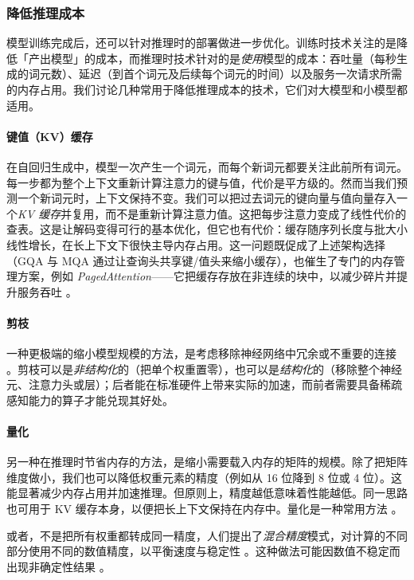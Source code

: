 \subsubsection{降低推理成本}
模型训练完成后，还可以针对推理时的部署做进一步优化。训练时技术关注的是降低「产出模型」的成本，而推理时技术针对的是\emph{使用}模型的成本：吞吐量（每秒生成的词元数）、延迟（到首个词元及后续每个词元的时间）以及服务一次请求所需的内存占用。我们讨论几种常用于降低推理成本的技术，它们对大模型和小模型都适用。

\paragraph{键值（KV）缓存} 在自回归生成中，模型一次产生一个词元，而每个新词元都要关注此前所有词元。每一步都为整个上下文重新计算注意力的键与值，代价是平方级的。然而当我们预测一个新词元时，上下文保持不变。我们可以把过去词元的键向量与值向量存入一个\emph{KV 缓存}并复用，而不是重新计算注意力值。这把每步注意力变成了线性代价的查表。这是让解码变得可行的基本优化，但它也有代价：缓存随序列长度与批大小线性增长，在长上下文下很快主导内存占用。这一问题既促成了上述架构选择（GQA 与 MQA 通过让查询头共享键/值头来缩小缓存），也催生了专门的内存管理方案，例如 \emph{PagedAttention}——它把缓存存放在非连续的块中，以减少碎片并提升服务吞吐 \citep{kwon2023efficient}。

\paragraph{剪枝} 一种更极端的缩小模型规模的方法，是考虑移除神经网络中冗余或不重要的连接 \citep{ma2023llm}。剪枝可以是\emph{非结构化}的（把单个权重置零），也可以是\emph{结构化}的（移除整个神经元、注意力头或层）；后者能在标准硬件上带来实际的加速，而前者需要具备稀疏感知能力的算子才能兑现其好处。

\paragraph{量化} 另一种在推理时节省内存的方法，是缩小需要载入内存的矩阵的规模。除了把矩阵维度做小，我们也可以降低权重元素的精度（例如从 16 位降到 8 位或 4 位）。这能显著减少内存占用并加速推理。但原则上，精度越低意味着性能越低。同一思路也可用于 KV 缓存本身，以便把长上下文保持在内存中。量化是一种常用方法 \citep{dettmers2022gpt3, dettmers2023case, xiao2023smoothquant}。

或者，不是把所有权重都转成同一精度，人们提出了\emph{混合精度}模式，对计算的不同部分使用不同的数值精度，以平衡速度与稳定性 \citep{micikevicius2017mixed}。这种做法可能因数值不稳定而出现非确定性结果 \citep{yuan2025understanding}。

